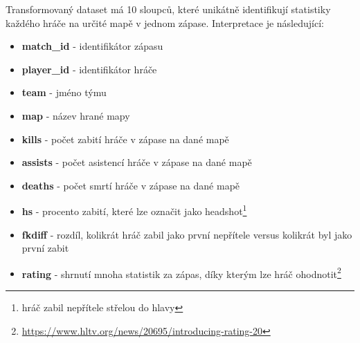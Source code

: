 \newpage
Transformovaný dataset má 10 sloupců, které unikátně identifikují statistiky každého hráče na určité mapě v jednom zápase. Interpretace je následující:
\begin{itemize}
    \item \textbf{match\_id} - identifikátor zápasu
    \item \textbf{player\_id} - identifikátor hráče
    \item \textbf{team} - jméno týmu
    \item \textbf{map} - název hrané mapy
    \item \textbf{kills} - počet zabití hráče v zápase na dané mapě
    \item \textbf{assists} - počet asistencí hráče v zápase na dané mapě
    \item \textbf{deaths} - počet smrtí hráče v zápase na dané mapě
    \item \textbf{hs} - procento zabití, které lze označit jako headshot\footnote{hráč zabil nepřítele střelou do hlavy}
    \item \textbf{fkdiff} - rozdíl, kolikrát hráč zabil jako první nepřítele versus kolikrát byl jako první zabit
    \item \textbf{rating} - shrnutí mnoha statistik za zápas, díky kterým lze hráč ohodnotit\footnote{\url{https://www.hltv.org/news/20695/introducing-rating-20}}
\end{itemize}

